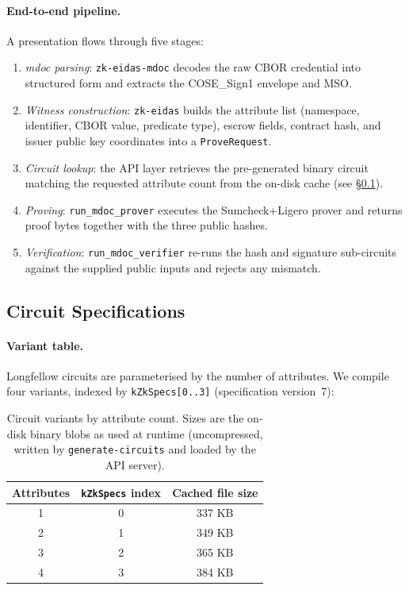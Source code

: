 \paragraph{End-to-end pipeline.}
A presentation flows through five stages:
\begin{enumerate}
  \item \emph{mdoc parsing}: \texttt{zk-eidas-mdoc} decodes the raw CBOR credential into
        structured form and extracts the COSE\_Sign1 envelope and MSO.
  \item \emph{Witness construction}: \texttt{zk-eidas} builds the attribute list (namespace,
        identifier, CBOR value, predicate type), escrow fields, contract hash, and issuer public
        key coordinates into a \texttt{ProveRequest}.
  \item \emph{Circuit lookup}: the API layer retrieves the pre-generated binary circuit matching
        the requested attribute count from the on-disk cache (see \S\ref{sec:impl-circuits}).
  \item \emph{Proving}: \texttt{run\_mdoc\_prover} executes the Sumcheck+Ligero prover and
        returns proof bytes together with the three public hashes.
  \item \emph{Verification}: \texttt{run\_mdoc\_verifier} re-runs the hash and signature
        sub-circuits against the supplied public inputs and rejects any mismatch.
\end{enumerate}

\subsection{Circuit Specifications}\label{sec:impl-circuits}

\paragraph{Variant table.}
Longfellow circuits are parameterised by the number of attributes.
We compile four variants, indexed by \texttt{kZkSpecs[0..3]} (specification version~7):

\begin{table}[t]
  \centering
  \caption{Circuit variants by attribute count.
           Sizes are the on-disk binary blobs as used at runtime (uncompressed, written
           by \texttt{generate-circuits} and loaded by the API server).}\label{tab:circuits}
  \begin{tabular}{ccc}
    \toprule
    Attributes & \texttt{kZkSpecs} index & Cached file size \\
    \midrule
    1 & 0 & 337 KB \\
    2 & 1 & 349 KB \\
    3 & 2 & 365 KB \\
    4 & 3 & 384 KB \\
    \bottomrule
  \end{tabular}
\end{table}

